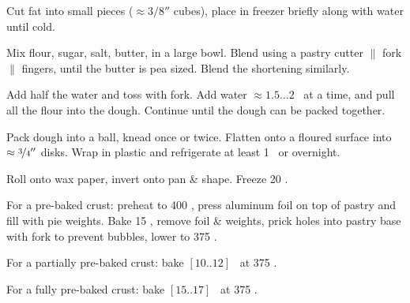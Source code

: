\begin{preparation}
\item Cut fat into small pieces ($\approx 3/8''$ cubes), place in freezer briefly along with water until cold.

\item Mix flour, sugar, salt, butter, in a large bowl.
	Blend using a pastry cutter $\|$ fork $\|$ fingers, until the butter is pea sized.
	Blend the shortening similarly.

\item Add half the water and toss with fork.
	Add water $\approx 1.5 \dots 2$ \Tablespoon~at a time, and pull all the flour into the dough.
	Continue until the dough can be packed together.

\item Pack dough into a ball, knead once or twice.
	Flatten onto a floured surface into $\approx \nicefrac{3}{4}''$ disks.
	Wrap in plastic and refrigerate at least 1 \hour~or overnight.

\item Roll onto wax paper, invert onto pan \& shape.
	Freeze 20 \minute.

\item For a pre-baked crust: preheat to 400 \Fahrenheit, press aluminum foil on top of pastry and fill with pie weights.
	Bake 15 \minute, remove foil \& weights, prick holes into pastry base with fork to prevent bubbles, lower to 375 \Fahrenheit.

\item For a partially pre-baked crust: bake $[10..12]$ \minute~at 375 \Fahrenheit.

\item For a fully pre-baked crust: bake $[15..17]$ \minute~at 375 \Fahrenheit.
\end{preparation}


\recipeend%
